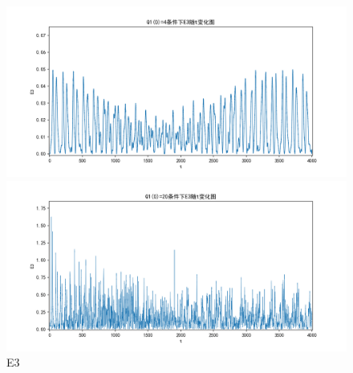 \documentclass[10pt, a4paper]{article}
\begin{document}
    \begin{figure}[H]
        \begin{minipage}[t]{0.49\textwidth}
            \centering
            \includegraphics[width=\textwidth]{./q5_pics/cmp/E3.png}
        \end{minipage}
        \begin{minipage}[t]{0.49\textwidth}
            \centering
            \includegraphics[width=\textwidth]{./q5_pics/exp/E3.png}
        \end{minipage}
        \caption{E3}\label{fig:E3 in q5}
    \end{figure}
\end{document}
